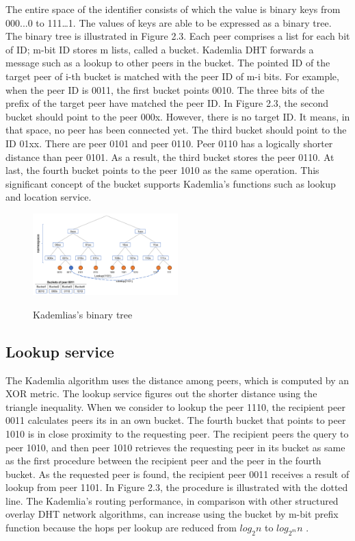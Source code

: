 The entire space of the identifier consists of which the value is binary keys from 000...0 to 111…1. The values of keys are able to be expressed as a binary tree. The binary tree is illustrated in Figure 2.3. Each peer comprises a list for each bit of ID; m-bit ID stores m lists, called a bucket. Kademlia DHT forwards a message such as a lookup to other peers in the bucket. The pointed ID of the target peer of i-th bucket is matched with the peer ID of m-i bits. For example, when the peer ID is 0011, the first bucket points 0010. The three bits of the prefix of the target peer have matched the peer ID. In Figure 2.3, the second bucket should point to the peer 000x. However, there is no target ID. It means, in that space, no peer has been connected yet. The third bucket should point to the ID 01xx. There are peer 0101 and peer 0110. Peer 0110 has a logically shorter distance than peer 0101. As a result, the third bucket stores the peer 0110. At last, the fourth bucket points to the peer 1010 as the same operation. This significant concept of the bucket supports Kademlia’s functions such as lookup and location service.

\begin{figure}[!ht]
	\centering
	\includegraphics[width=0.5\textwidth]{images/fig_2_3.pdf}\\
	\caption{Kademlias’s binary tree}
	\label{fig:kademlia}
\end{figure}

\subsection{Lookup service}

The Kademlia algorithm uses the distance among peers, which is computed by an XOR metric. The lookup service figures out the shorter distance using the triangle inequality. When we consider to lookup the peer 1110, the recipient peer 0011 calculates peers its in an own bucket. The fourth bucket that points to peer 1010 is in close proximity to the requesting peer. The recipient peers the query to peer 1010, and then peer 1010 retrieves the requesting peer in its bucket as same as the first procedure between the recipient peer and the peer in the fourth bucket. As the requested peer is found, the recipient peer 0011 receives a result of lookup from peer 1101. In Figure 2.3, the procedure is illustrated with the dotted line. The Kademlia’s routing performance, in comparison with other structured overlay DHT network algorithms, can increase using the bucket by m-bit prefix function because the hops per lookup are reduced from ${log}_2{n}$ to ${log}_{2^m}{n}$ \cite{druschel2003peer}.

